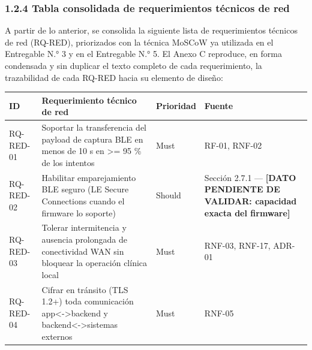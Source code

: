 \documentclass[11pt,a4paper]{article}
\begin{document}
\subsubsection{1.2.4 Tabla consolidada de requerimientos técnicos de red}\label{tabla-consolidada-de-requerimientos-tuxe9cnicos-de-red}

A partir de lo anterior, se consolida la siguiente lista de requerimientos técnicos de red (RQ-RED), priorizados con la técnica MoSCoW ya utilizada en el Entregable N.° 3 y en el Entregable N.° 5. El Anexo C reproduce, en forma condensada y sin duplicar el texto completo de cada requerimiento, la trazabilidad de cada RQ-RED hacia su elemento de diseño:

{\small
\begin{longtable}[]{@{}
  >{\raggedright\arraybackslash}p{}
  >{\raggedright\arraybackslash}p{}
  >{\raggedright\arraybackslash}p{}
  >{\raggedright\arraybackslash}p{}@{}}
\toprule\noalign{}
\begin{minipage}[b]{\linewidth}\raggedright
ID
\end{minipage} & \begin{minipage}[b]{\linewidth}\raggedright
Requerimiento técnico de red
\end{minipage} & \begin{minipage}[b]{\linewidth}\raggedright
Prioridad
\end{minipage} & \begin{minipage}[b]{\linewidth}\raggedright
Fuente
\end{minipage} \\
\midrule\noalign{}
\endhead
\bottomrule\noalign{}
\endlastfoot
RQ-RED-01 & Soportar la transferencia del payload de captura BLE en menos de 10 s en \textgreater= 95 \% de los intentos & Must & RF-01, RNF-02 \\
RQ-RED-02 & Habilitar emparejamiento BLE seguro (LE Secure Connections cuando el firmware lo soporte) & Should & Sección 2.7.1 --- \textbf{{[}DATO PENDIENTE DE VALIDAR: capacidad exacta del firmware{]}} \\
RQ-RED-03 & Tolerar intermitencia y ausencia prolongada de conectividad WAN sin bloquear la operación clínica local & Must & RNF-03, RNF-17, ADR-01 \\
RQ-RED-04 & Cifrar en tránsito (TLS 1.2+) toda comunicación app\textless-\textgreater backend y backend\textless-\textgreater sistemas externos & Must & RNF-05 \\

\end{longtable}}
\end{document}
